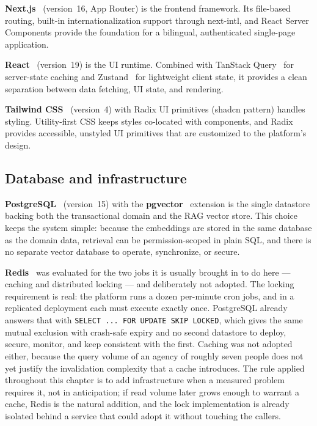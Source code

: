 \textbf{Next.js}~\cite{nextjs} (version~16, App Router) is the frontend framework. Its
file-based routing, built-in internationalization support through next-intl, and React Server
Components provide the foundation for a bilingual, authenticated single-page application.

\textbf{React}~\cite{react} (version~19) is the UI runtime. Combined with TanStack
Query~\cite{tanstackquery} for server-state caching and Zustand~\cite{zustand} for lightweight
client state, it provides a clean separation between data fetching, UI state, and rendering.

\textbf{Tailwind CSS}~\cite{tailwindcss} (version~4) with Radix UI primitives (shadcn pattern)
handles styling. Utility-first CSS keeps styles co-located with components, and Radix provides
accessible, unstyled UI primitives that are customized to the platform's design.

\subsection{Database and infrastructure}

\textbf{PostgreSQL}~\cite{postgresql} (version~15) with the \textbf{pgvector}~\cite{pgvector}
extension is the single datastore backing both the transactional domain and the RAG vector
store. This choice keeps the system simple: because the embeddings are stored in the same
database as the domain data, retrieval can be permission-scoped in plain SQL, and there is no
separate vector database to operate, synchronize, or secure.

\textbf{Redis}~\cite{redis} was evaluated for the two jobs it is usually brought in to do here
--- caching and distributed locking --- and deliberately not adopted. The locking requirement is
real: the platform runs a dozen per-minute cron jobs, and in a replicated deployment each must
execute exactly once. PostgreSQL already answers that with \texttt{SELECT ... FOR UPDATE SKIP
LOCKED}, which gives the same mutual exclusion with crash-safe expiry and no second datastore to
deploy, secure, monitor, and keep consistent with the first. Caching was not adopted either,
because the query volume of an agency of roughly seven people does not yet justify the
invalidation complexity that a cache introduces. The rule applied throughout this chapter is to
add infrastructure when a measured problem requires it, not in anticipation; if read volume
later grows enough to warrant a cache, Redis is the natural addition, and the lock implementation
is already isolated behind a service that could adopt it without touching the callers.

